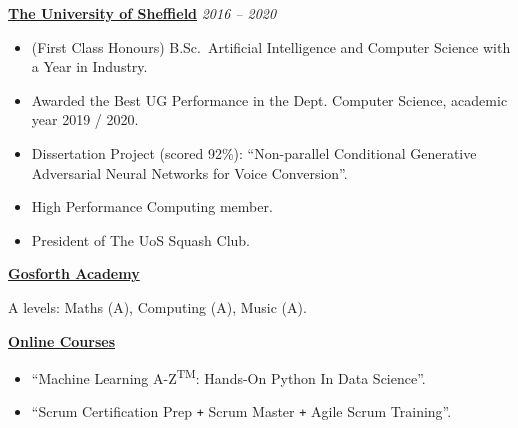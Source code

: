 \documentclass[10pt]{article} %
\begin{document}
\begin{changemargin}{0pt}{0.5pt}
\begin{minipage}[t]{0.44\textwidth}
\begin{changemargin}{1pt}{1pt}
\underline{\textbf{The University of Sheffield}} \hfill \textit{ 2016 --  2020}\\
\par
\vspace{-15pt}

\begin{itemize} \itemsep-2pt %
  \item (First Class Honours) B.Sc.\ Artificial Intelligence and Computer Science with a Year in Industry.
  \item Awarded the Best UG Performance in the Dept. Computer Science, academic year 2019 / 2020.
  \item Dissertation Project (scored 92\%): \enquote{Non-parallel Conditional Generative Adversarial Neural Networks for Voice Conversion}.
  \item High Performance Computing member.
  \item President of The UoS Squash Club.
\end{itemize}

	
\vspace{5pt}
\underline{\textbf{Gosforth Academy}}\\
\par
\vspace{-15pt}

\vspace{5pt}
A levels: Maths (A), Computing (A), Music (A).


\vspace{5pt}
\underline{\textbf{Online Courses}}\\
\par
\vspace{-15pt}

\begin{itemize} \itemsep-2pt %
	\item \enquote{Machine Learning A-Z\textsuperscript{TM}: Hands-On Python In Data Science}.
	\item \enquote{Scrum Certification Prep \texttt{+} Scrum Master \texttt{+} Agile Scrum Training}.
\end{itemize}
	

\end{changemargin}
\end{minipage}
\end{changemargin}
\end{document}
